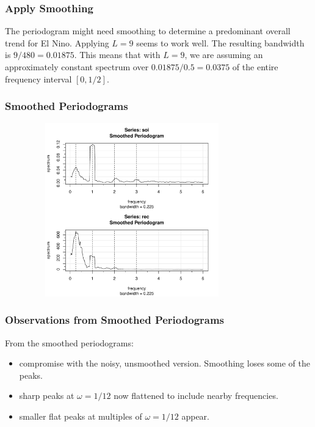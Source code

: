 \documentclass[%
xcolor=pdftex]{beamer}
\begin{document}
\begin{frame}
\frametitle{Apply Smoothing}

The periodogram might need smoothing to determine a predominant overall trend for El Nino. Applying $L=9$ seems to work well. The resulting bandwidth is $9/480 = 0.01875$. This means that with $L=9$, we are assuming an approximately constant spectrum over $0.01875/0.5 = 0.0375$ of the entire frequency interval $[0, 1/2]$.

\end{frame}

\begin{frame}
\frametitle{Smoothed Periodograms}

\includegraphics[width=110mm, height=75mm]{smoothed.pdf}

\end{frame}

\begin{frame}
\frametitle{Observations from Smoothed Periodograms}

From the smoothed periodograms:

\begin{itemize}
\item compromise with the noisy, unsmoothed version. Smoothing loses some of the peaks.
\item sharp peaks at $\omega=1/12$ now flattened to include nearby frequencies.
\item smaller flat peaks at multiples of $\omega=1/12$ appear.
\end{itemize}

\end{frame}
\end{document}
